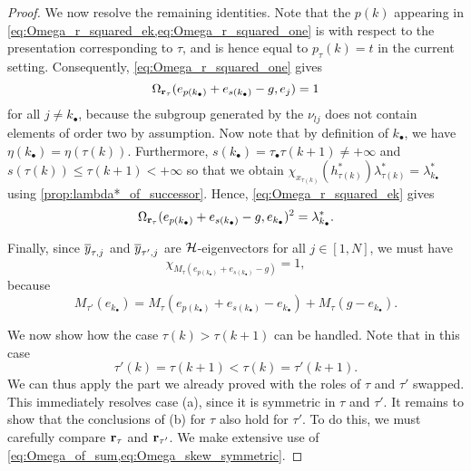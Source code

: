 \begin{proof}
	We now resolve the remaining identities. Note that the $p(k)$ appearing in
	\cref{eq:Omega_r_squared_ek,eq:Omega_r_squared_one} is with respect to the presentation
	corresponding to $\tau$, and is hence equal to $p_\tau(k) = t$ in the current setting.
	Consequently, \cref{eq:Omega_r_squared_one} gives
	\begin{equation*}
		\Omega_{\mathbf{r}_\tau}(e_{p(k_\bullet)} + e_{s(k_\bullet)} -g, e_j) = 1
	\end{equation*}
	for all $j\neq k_\bullet$, because the subgroup generated by the $\nu_{lj}$ does not contain elements of order two by assumption. Now note that by definition of $k_\bullet$,
	we have $\eta(k_\bullet) = \eta(\tau(k))$. Furthermore, $s(k_\bullet) =
		\tau_\bullet\tau(k+1) \neq + \infty$ and $s(\tau(k)) \leq \tau(k+1) < + \infty$ so that
	we obtain $\chi_{x_{\tau(k)}}(h^*_{\tau(k)})\lambda^*_{\tau(k)} =
		\lambda^*_{k_\bullet}$ using \cref{prop:lambda*_of_successor}. Hence, \cref{eq:Omega_r_squared_ek} gives
	\begin{equation*}
		\Omega_{\mathbf{r}_\tau}(e_{p(k_\bullet)} + e_{s(k_\bullet)} - g, e_{k_\bullet})^2 = \lambda_{k_\bullet}^*.
	\end{equation*}

	Finally, since $\overline{y}_{\tau, j}$ and $\overline{y}_{\tau', j}$ are $\mathcal{H}$-eigenvectors for all
	$j\in [1, N]$, we must have
	\begin{equation*}
		\chi_{M_\tau(e_{p(k_\bullet)} + e_{s(k_\bullet)} - g)} = 1,
	\end{equation*}
	because
	\begin{equation*}
		M_{\tau'}(e_{k_\bullet}) =
		M_\tau(e_{p(k_\bullet)} + e_{s(k_\bullet)} - e_{k_\bullet}) + M_\tau(g-e_{k_\bullet}).
	\end{equation*}

	\medskip

	We now show how the case $\tau(k) > \tau(k+1)$ can be handled. Note that in this case
	\begin{equation*}
		\tau'(k) = \tau(k+1) < \tau(k) = \tau'(k+1).
	\end{equation*}
	We can thus apply the part we already proved with the roles of $\tau$ and $\tau'$
	swapped. This immediately resolves case (a), since it is symmetric in $\tau$ and
	$\tau'$. It remains to show that the conclusions of (b) for $\tau$ also hold for
	$\tau'$. To do this, we must carefully compare $\mathbf{r}_\tau$ and $\mathbf{r}_{\tau'}$. We make
	extensive use of \cref{eq:Omega_of_sum,eq:Omega_skew_symmetric}.


\end{proof}
